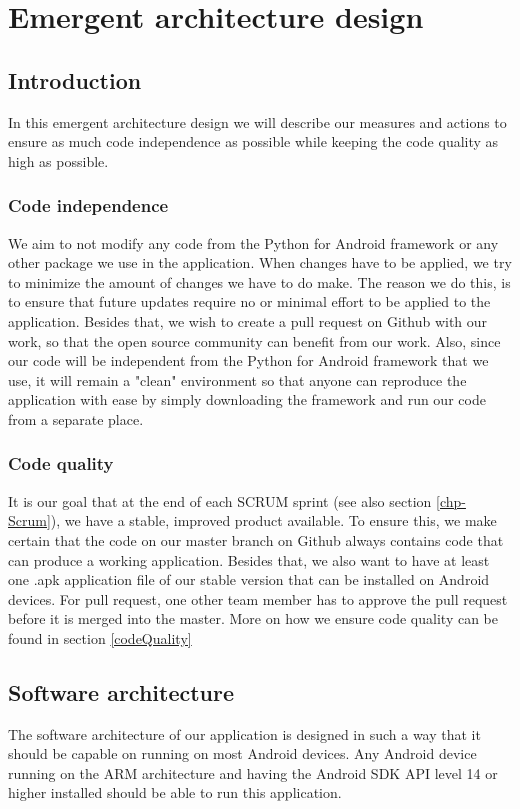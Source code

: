 \chapter{Emergent architecture design}

\section{Introduction}
In this emergent architecture design we will describe our measures and actions to ensure as much code independence as possible while keeping the code quality as high as possible.

\subsection{Code independence}
We aim to not modify any code from the Python for Android framework or any other package we use in the application. When changes have to be applied, we try to minimize the amount of changes we have to do make.
The reason we do this, is to ensure that future updates require no or minimal effort to be applied to the application.
Besides that, we wish to create a pull request on Github with our work, so that the open source community can benefit from our work.
Also, since our code will be independent from the Python for Android framework that we use, it will remain a "clean" environment so that anyone can reproduce the application with ease by simply downloading the framework and run our code from a separate place.

\subsection{Code quality}
It is our goal that at the end of each SCRUM sprint (see also section \ref{chp-Scrum}), we have a stable, improved product available. To ensure this, we make certain that the code on our master branch on Github always contains code that can produce a working application. Besides that, we also want to have at least one .apk application file of our stable version that can be installed on Android devices. For pull request, one other team member has to approve the pull request before it is merged into the master.
More on how we ensure code quality can be found in section \ref{codeQuality}

\section{Software architecture}
 The software architecture of our application is designed in such a way that it should be capable on running on most Android devices. Any Android device running on the ARM architecture and having the Android SDK API level 14 or higher installed should be able to run this application.
 
